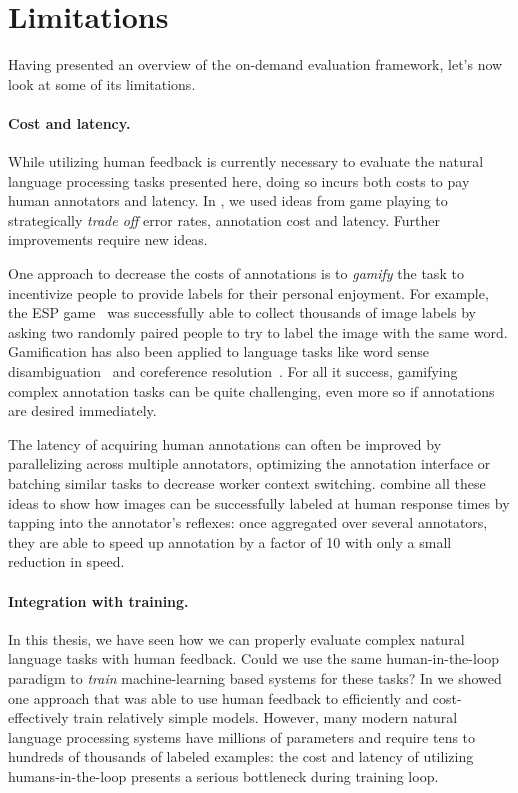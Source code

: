 \section{Limitations}
Having presented an overview of the on-demand evaluation framework, let's now look at some of its limitations.

\paragraph{Cost and latency.}
While utilizing human feedback is currently necessary to evaluate the natural language processing tasks presented here,
  doing so incurs both costs to pay human annotators and latency.
In , we used ideas from game playing to strategically \textit{trade off} error rates, annotation cost and latency. 
Further improvements require new ideas.

One approach to decrease the costs of annotations is to \textit{gamify} the task to incentivize people to provide labels for their personal enjoyment.
For example, the ESP game~\citep{ahn2004labeling} was successfully able to collect thousands of image labels by asking two randomly paired people to try to label the image with the same word.
Gamification has also been applied to language tasks like word sense disambiguation~\citep{vannella2014validating} and coreference resolution~\citep{poesio2013phrase}.
For all it success, gamifying complex annotation tasks can be quite challenging, even more so if annotations are desired immediately.

The latency of acquiring human annotations can often be improved by parallelizing across multiple annotators, optimizing the annotation interface  or batching similar tasks to decrease worker context switching.
\citet{krishna2016embracing} combine all these ideas to show how images can be successfully labeled at human response times by tapping into the annotator's reflexes: once aggregated over several annotators, they are able to speed up annotation by a factor of 10 with only a small reduction in speed.

\paragraph{Integration with training.}
In this thesis, we have seen how we can properly evaluate complex natural language tasks with human feedback.
Could we use the same human-in-the-loop paradigm to \textit{train} machine-learning based systems for these tasks?
In  we showed one approach that was able to use human feedback to efficiently and cost-effectively train relatively simple models.
However, many modern natural language processing systems have millions of parameters and require tens to hundreds of thousands of labeled examples:
  the cost and latency of utilizing humans-in-the-loop presents a serious bottleneck during training loop.

